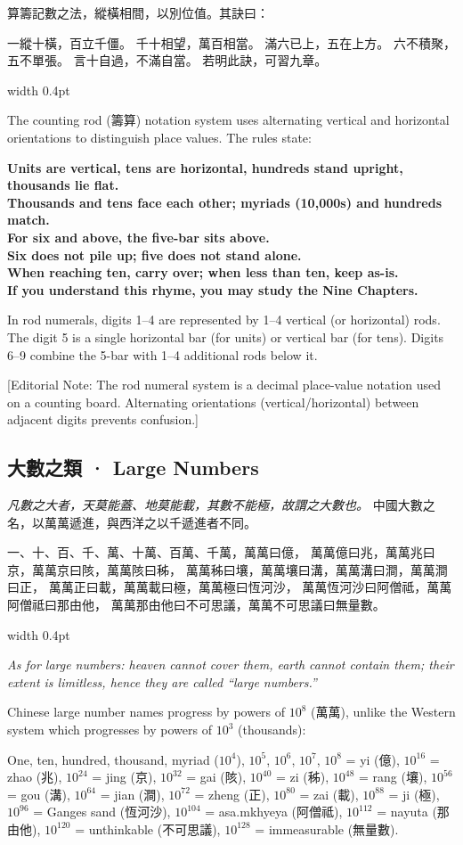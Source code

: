 \documentclass[10pt,a4paper]{article}
\newlength{\cnwidth}
\newlength{\enwidth}
\newcommand{\bilingual}[2]{%
  \noindent%
  \begin{minipage}[t]{\cnwidth}%
    #1%
  \end{minipage}%
  \hfill\vrule width 0.4pt\hfill%
  \begin{minipage}[t]{\enwidth}%
    #2%
  \end{minipage}%
  \par\smallskip%
}
\newcommand{\bilingualsubsection}[2]{%
  \subsection*{#1 · #2}
}
\newcommand{\transnote}[1]{%
  \par\smallskip\noindent\textcolor{notecolor}{\small[Editorial Note: #1]}\par\smallskip
}
\begin{document}
\bilingual{%
  算籌記數之法，縱橫相間，以別位值。其訣曰：

  一縱十橫，百立千僵。
  千十相望，萬百相當。
  滿六已上，五在上方。
  六不積聚，五不單張。
  言十自過，不滿自當。
  若明此訣，可習九章。
}{%
  The counting rod (籌算) notation system uses alternating vertical and horizontal
  orientations to distinguish place values. The rules state:

  \textbf{Units are vertical, tens are horizontal, hundreds stand upright, thousands lie flat.}\\
  \textbf{Thousands and tens face each other; myriads (10,000s) and hundreds match.}\\
  \textbf{For six and above, the five-bar sits above.}\\
  \textbf{Six does not pile up; five does not stand alone.}\\
  \textbf{When reaching ten, carry over; when less than ten, keep as-is.}\\
  \textbf{If you understand this rhyme, you may study the Nine Chapters.}

  In rod numerals, digits 1--4 are represented by 1--4 vertical (or horizontal) rods.
  The digit 5 is a single horizontal bar (for units) or vertical bar (for tens).
  Digits 6--9 combine the 5-bar with 1--4 additional rods below it.
}

\transnote{The rod numeral system is a decimal place-value notation used on a counting board.
Alternating orientations (vertical/horizontal) between adjacent digits prevents confusion.}

\bilingualsubsection{大數之類}{Large Numbers}

\bilingual{%
  \textit{凡數之大者，天莫能蓋、地莫能載，其數不能極，故謂之大數也。}
  中國大數之名，以萬萬遞進，與西洋之以千遞進者不同。

  一、十、百、千、萬、十萬、百萬、千萬，萬萬曰億，
  萬萬億曰兆，萬萬兆曰京，萬萬京曰陔，萬萬陔曰秭，
  萬萬秭曰壤，萬萬壤曰溝，萬萬溝曰澗，萬萬澗曰正，
  萬萬正曰載，萬萬載曰極，萬萬極曰恆河沙，
  萬萬恆河沙曰阿僧祗，萬萬阿僧祗曰那由他，
  萬萬那由他曰不可思議，萬萬不可思議曰無量數。
}{%
  \textit{As for large numbers: heaven cannot cover them, earth cannot contain them;
  their extent is limitless, hence they are called ``large numbers.''}

  Chinese large number names progress by powers of $10^8$ (萬萬), unlike the Western
  system which progresses by powers of $10^3$ (thousands):

  One, ten, hundred, thousand, myriad ($10^4$), $10^5$, $10^6$, $10^7$,
  $10^8$ = yi (億), $10^{16}$ = zhao (兆), $10^{24}$ = jing (京),
  $10^{32}$ = gai (陔), $10^{40}$ = zi (秭), $10^{48}$ = rang (壤),
  $10^{56}$ = gou (溝), $10^{64}$ = jian (澗), $10^{72}$ = zheng (正),
  $10^{80}$ = zai (載), $10^{88}$ = ji (極), $10^{96}$ = Ganges sand (恆河沙),
  $10^{104}$ = asa.mkhyeya (阿僧祗), $10^{112}$ = nayuta (那由他),
  $10^{120}$ = unthinkable (不可思議), $10^{128}$ = immeasurable (無量數).
}
\end{document}

